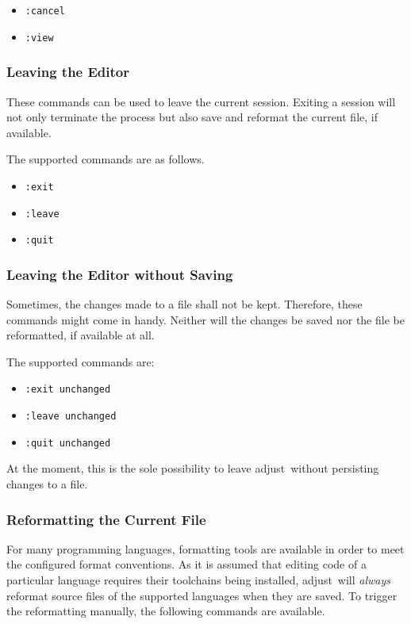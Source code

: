 \documentclass[11pt, a4paper, british]{scrartcl}
\DeclareRobustCommand{\adjust}{\textsf{adjust}}
\begin{document}
\begin{itemize}
\item \texttt{:cancel}
\item \texttt{:view}
\end{itemize}

\subsubsection{Leaving the Editor}
\label{sec:leaving-the-editor}
These commands can be used to leave the current session.  Exiting a session will
not only terminate the process but also save and reformat the current file, if
available.

The supported commands are as follows.

\begin{itemize}
\item \texttt{:exit}
\item \texttt{:leave}
\item \texttt{:quit}
\end{itemize}

\subsubsection{Leaving the Editor without Saving}
\label{sec:leaving-the-editor-without-saving}
Sometimes, the changes made to a file shall not be kept.  Therefore, these
commands might come in handy.  Neither will the changes be saved nor the file be
reformatted, if available at all.

The supported commands are:

\begin{itemize}
\item \texttt{:exit unchanged}
\item \texttt{:leave unchanged}
\item \texttt{:quit unchanged}
\end{itemize}

At the moment, this is the sole possibility to leave \adjust\ without persisting
changes to a file.

\subsubsection{Reformatting the Current File}
\label{sec:reformatting-the-current-file}
For many programming languages, formatting tools are available in order to meet
the configured format conventions.  As it is assumed that editing code of a
particular language requires their toolchains being installed, \adjust\ will
\emph{always} reformat source files of the supported languages when they are
saved.  To trigger the reformatting manually, the following commands are
available.
\end{document}
